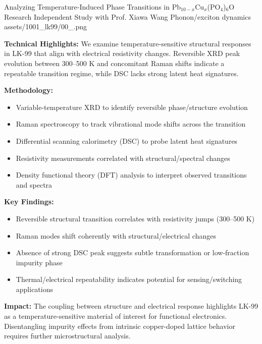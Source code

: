 \ProjectEntry
{Analyzing Temperature-Induced Phase Transitions in Pb$_{10-x}$Cu$_x$(PO$_4$)$_6$O}
{Research Independent Study with Prof. Xiawa Wang}
{Phonon/exciton dynamics}
{
}
{assets/1001_lk99/00_.png}
{ \quad {}}
{  }

\textbf{Technical Highlights:}
We examine temperature-sensitive structural responses in LK-99 that align with electrical resistivity changes. Reversible XRD peak evolution between 300--500 K and concomitant Raman shifts indicate a repeatable transition regime, while DSC lacks strong latent heat signatures.

\textbf{Methodology:}
\begin{itemize}[leftmargin=1.2em, itemsep=0.1em]
  \item Variable-temperature XRD to identify reversible phase/structure evolution
  \item Raman spectroscopy to track vibrational mode shifts across the transition
  \item Differential scanning calorimetry (DSC) to probe latent heat signatures
  \item Resistivity measurements correlated with structural/spectral changes
  \item Density functional theory (DFT) analysis to interpret observed transitions and spectra
\end{itemize}

\textbf{Key Findings:}
\begin{itemize}[leftmargin=1.2em, itemsep=0.1em]
  \item Reversible structural transition correlates with resistivity jumps (300--500 K)
  \item Raman modes shift coherently with structural/electrical changes
  \item Absence of strong DSC peak suggests subtle transformation or low-fraction impurity phase
  \item Thermal/electrical repeatability indicates potential for sensing/switching applications
\end{itemize}

\textbf{Impact:} 
The coupling between structure and electrical response highlights LK-99 as a temperature-sensitive material of interest for functional electronics. Disentangling impurity effects from intrinsic copper-doped lattice behavior requires further microstructural analysis.